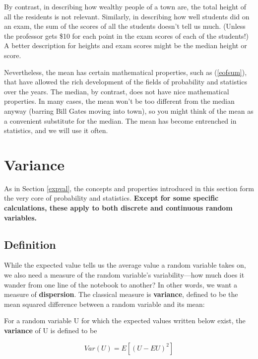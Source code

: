By contrast, in describing how wealthy people of a town are, the total
height of all the residents is not relevant.  Similarly, in describing
how well students did on an exam, the sum of the scores of all the
students doesn't tell us much.  (Unless the professor gets \$10 for each
point in the exam scores of each of the students!) A better description
for heights and exam scores might be the median height or score.

Nevertheless, the mean has certain mathematical properties, such as
(\ref{eofsum}), that have allowed the rich development of the fields of
probability and statistics over the years.  The median, by contrast,
does not have nice mathematical properties.  In many cases, the mean
won't be too different from the median anyway (barring Bill Gates moving
into town), so you might think of the mean as a convenient substitute
for the median.  The mean has become entrenched in statistics, and we
will use it often.

\section{Variance}
\label{variance}

As in Section \ref{expval}, the concepts and properties introduced in
this section form the very core of probability and statistics.  {\bf
Except for some specific calculations, these apply to both discrete and
continuous random variables.}

\subsection{Definition}

While the expected value tells us the average value a random variable
takes on, we also need a measure of the random variable's
variability---how much does it wander from one line of the notebook to
another?  In other words, we want a measure of {\bf dispersion}.  The
classical measure is {\bf variance}, defined to be the mean squared
difference between a random variable and its mean:

\begin{definition}  For a random variable U for which the expected
values written below exist, the {\bf variance} of U is defined to be

\begin{equation}
\label{vardef}
Var(U) = E[(U-EU)^2]
\end{equation}

\end{definition}

